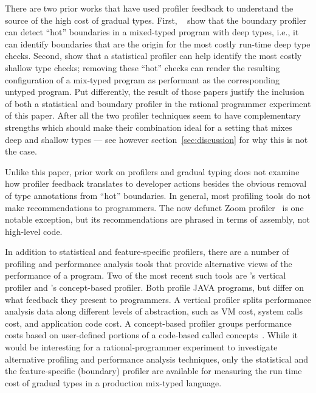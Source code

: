 There are two prior works that have used profiler feedback to understand
the source of the high cost of gradual types.  First,
~\citet{astavf-feature-prf} show that the boundary profiler can detect
``hot'' boundaries in a mixed-typed program with deep types, i.e., it can
identify boundaries that are the origin for the most costly run-time deep
type checks. Second, \cite{grmhn-vmil-2019} show that a statistical
profiler can help identify the most costly shallow type checks; removing
these ``hot'' checks can render the resulting configuration of a mix-typed
program as performant as the corresponding untyped program.  Put
differently, the result of those papers justify the inclusion of both a
statistical and boundary profiler in the rational programmer experiment of
this paper.  After all the two profiler techniques seem to have
complementary strengths which should make their combination ideal for a
setting that mixes deep and shallow types --- see however
section~\ref{sec:discussion} for why this is not the case. 

Unlike this paper, prior work on profilers and gradual typing does not
examine how profiler feedback translates to developer actions
besides the obvious removal of type annotations from ``hot'' boundaries. 
In general, most profiling tools do not make recommendations to
programmers. The now defunct Zoom profiler~\cite{zoom} is one
notable exception, but its recommendations are phrased in 
terms of assembly, not high-level code.  

In addition to statistical and feature-specific profilers, there are a
number of profiling and performance analysis tools that provide
alternative views of the performance of a program. Two of the most recent
such tools are \citet{vertical-profiler}'s vertical profiler and
\citet{java-profile-concepts}'s concept-based profiler. Both profile JAVA
programs, but differ on what feedback they present to programmers. A
vertical profiler splits performance analysis data   along different
levels of abstraction, such as VM cost, system calls cost, and application
code cost. A concept-based profiler groups performance costs based on
user-defined portions of a code-based called concepts~\cite{concepts}.
While it would be interesting for a rational-programmer experiment to
investigate alternative profiling and performance analysis
techniques, only the statistical and the feature-specific (boundary)
profiler are available for measuring the run time cost of gradual
types in a production mix-typed language.







